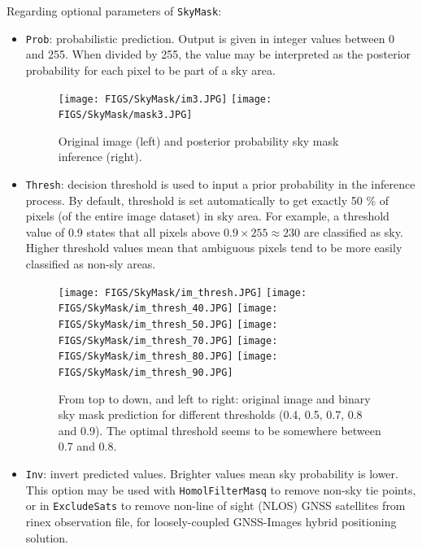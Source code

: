\noindent Regarding optional parameters of \texttt{SkyMask}: \newline

\begin{itemize}
	\item \texttt{Prob}: probabilistic prediction. Output is given in integer values between 0 and 255. When divided by 255, the value may be interpreted as the posterior probability for each pixel to be part of a sky area. \newline
	
	\begin{figure}[!h]
		\begin{center}
			\texttt{[image: FIGS/SkyMask/im3.JPG]}
			\hspace{0.2cm}
			\texttt{[image: FIGS/SkyMask/mask3.JPG]}
			\caption{Original image (left) and posterior probability sky mask inference (right).}
		\end{center}	
	\end{figure}
	
	\item \texttt{Thresh}: decision threshold is used to input a prior probability in the inference process. By default, threshold is set automatically to get exactly 50 \% of pixels (of the entire image dataset) in sky area. For example, a threshold value of 0.9 states that all pixels above $0.9 \times 255 \approx 230$ are classified as sky. Higher threshold values mean that ambiguous pixels tend to be more easily classified as non-sly areas. \newline
	
	\begin{figure}[!h]
		\begin{center}
			\texttt{[image: FIGS/SkyMask/im\_thresh.JPG]}
			\texttt{[image: FIGS/SkyMask/im\_thresh\_40.JPG]}
			\texttt{[image: FIGS/SkyMask/im\_thresh\_50.JPG]}
			\texttt{[image: FIGS/SkyMask/im\_thresh\_70.JPG]}
			\texttt{[image: FIGS/SkyMask/im\_thresh\_80.JPG]}
			\texttt{[image: FIGS/SkyMask/im\_thresh\_90.JPG]}
			\caption{From top to down, and left to right: original image and binary sky mask prediction for different thresholds (0.4, 0.5, 0.7, 0.8 and 0.9). The optimal threshold seems to be somewhere between 0.7 and 0.8.}
		\end{center}	
	\end{figure}
	
	\item  \texttt{Inv}: invert predicted values. Brighter values mean sky probability is lower. This option may be used with \texttt{HomolFilterMasq} to remove non-sky tie points, or in \texttt{ExcludeSats} to remove non-line of sight (NLOS) GNSS satellites from rinex observation file, for loosely-coupled GNSS-Images hybrid positioning solution. \newline
	

\end{itemize}
